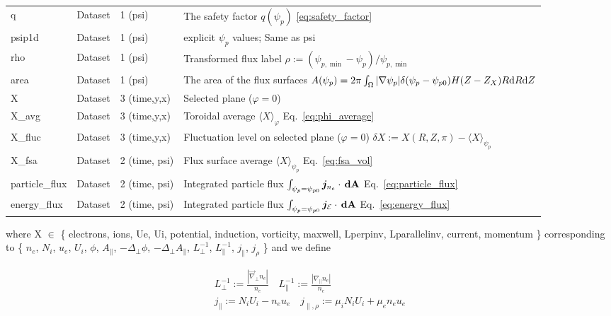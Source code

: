 \begin{longtable}{lll>{\RaggedRight}p{7cm}}
q                & Dataset & 1 (psi) & The safety factor $q(\psi_p)$ \eqref{eq:safety_factor} \\
psip1d           & Dataset & 1 (psi) & explicit $\psi_p$ values; Same as psi \\
rho              & Dataset & 1 (psi) & Transformed flux label $\rho:= (\psi_{p,\min} - \psi_p)/\psi_{p,\min}$ \\
area             & Dataset & 1 (psi) & The area of the flux surfaces $A(\psi_p) = 2\pi \int_\Omega |\nabla\psi_p| \delta(\psi_p - \psi_{p0}) H(Z-Z_X) R\mathrm{d} R\mathrm{d} Z$ \\
X                & Dataset & 3 (time,y,x) & Selected plane ($\varphi=0$) \\
X\_avg           & Dataset & 3 (time,y,x) & Toroidal average $\langle X
    \rangle_\varphi$ Eq.~\eqref{eq:phi_average} \\
X\_fluc       & Dataset & 3 (time,y,x) & Fluctuation level on selected plane ($\varphi= 0$) $\delta X := X(R,Z,\pi) - \langle X\rangle_{\psi_{p}}$ \\
X\_fsa           & Dataset & 2 (time, psi) & Flux surface average $\langle X\rangle_{\psi_p}$ Eq.~\eqref{eq:fsa_vol} \\
particle\_flux   & Dataset & 2 (time, psi) & Integrated particle flux $\int_{\psi_p = \psi_{p0}}{\boldsymbol{j}}_{n_e} \cdot {\boldsymbol{\,\mathrm{dA}}}$ Eq.~\eqref{eq:particle_flux} \\
energy\_flux     & Dataset & 2 (time, psi) & Integrated particle flux $\int_{\psi_p = \psi_{p0}}{\boldsymbol{j}}_{\mathcal E} \cdot {\boldsymbol{\,\mathrm{dA}}}$ Eq.~\eqref{eq:energy_flux} \\
\bottomrule
\end{longtable}
where X $\in$ \{ electrons, ions, Ue, Ui, potential,
induction, vorticity, maxwell, Lperpinv, Lparallelinv,
current, momentum
\} corresponding to \{
    $n_e$, $N_i$, $u_e$, $U_i$, $\phi$, $A_\parallel$,
    $-\Delta_\perp \phi$, $-\Delta_\perp A_\parallel$,
    $L_\perp^{-1}$, $L_\parallel^{-1}$,
    $j_\parallel$, $j_\rho$
    \}
and we define

\begin{align}
   L_\perp^{-1} := \frac{|\vec\nabla_\perp n_e|}{n_e}\quad
   L_\parallel^{-1} := \frac{|\nabla_\parallel n_e|}{n_e} \\
   j_\parallel := N_iU_i-n_e u_e \quad
   j_{\parallel,\rho} := \mu_i N_iU_i + \mu_e n_e u_e
\end{align}








